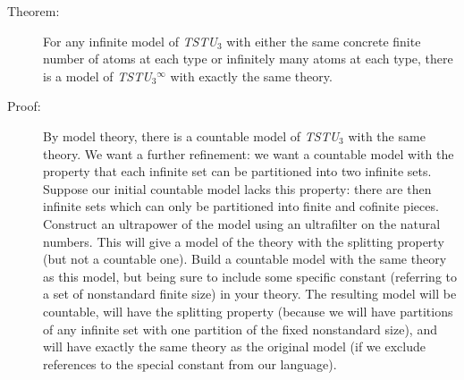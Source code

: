 \documentclass[12pt]{book}
\begin{document}
\begin{description}

\item[Theorem:] For any infinite model of {\em TSTU$_3$\/} with either
the same concrete finite number of atoms at each type or infinitely
many atoms at each type, there is a model of {\em TSTU$_3$\/}$^\infty$
with exactly the same theory.

\item[Proof:] By model theory, there is a countable model of {\em
TSTU$_3$\/} with the same theory.  We want a further refinement: we
want a countable model with the property that each infinite set can be
partitioned into two infinite sets.  Suppose our initial countable
model lacks this property: there are then infinite sets which can only
be partitioned into finite and cofinite pieces.  Construct an
ultrapower of the model using an ultrafilter on the natural numbers.
This will give a model of the theory with the splitting property (but
not a countable one).  Build a countable model with the same theory as
this model, but being sure to include some specific constant
(referring to a set of nonstandard finite size) in your theory.  The
resulting model will be countable, will have the splitting property
(because we will have partitions of any infinite set with one
partition of the fixed nonstandard size), and will have exactly the
same theory as the original model (if we exclude references to the
special constant from our language).


\end{description}
\end{document}
